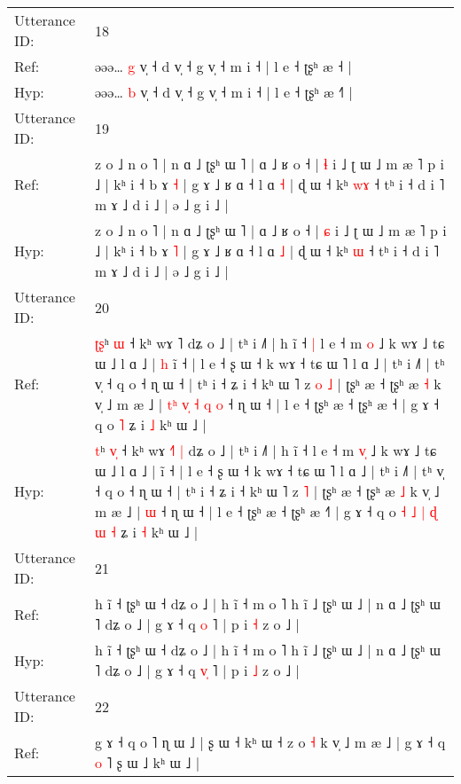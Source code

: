 \documentclass[10pt]{article}
\DeclareRobustCommand{\hl}[1]{{\textcolor{red}{#1}}}
\begin{document}
\begin{longtable}{ll}
\midrule
Utterance ID: & 18 \\
Ref: & əəə… \hl{g} v̩ ˧ d v̩ ˧ g v̩ ˧ m i ˧ | l e ˧ ʈʂʰ æ ˧\hl{} |
 \\
Hyp: & əəə… \hl{b} v̩ ˧ d v̩ ˧ g v̩ ˧ m i ˧ | l e ˧ ʈʂʰ æ ˧\hl{˥} |
 \\
\midrule
Utterance ID: & 19 \\
Ref: & z o ˩ n o ˥ | n ɑ ˩ ʈʂʰ ɯ ˥ | ɑ ˩ ʁ o ˧ | \hl{ɬ} i ˩ ʈ ɯ ˩ m æ ˥ p i ˩ | kʰ i ˧ b ɤ \hl{˧} | g ɤ ˩ ʁ ɑ ˧ l ɑ \hl{˧} | ɖ ɯ ˧ kʰ \hl{w}\hl{ɤ} ˧ tʰ i ˧ d i ˥ m ɤ ˩ d i ˩ | ə ˩ g i ˩ |
 \\
Hyp: & z o ˩ n o ˥ | n ɑ ˩ ʈʂʰ ɯ ˥ | ɑ ˩ ʁ o ˧ | \hl{ɕ} i ˩ ʈ ɯ ˩ m æ ˥ p i ˩ | kʰ i ˧ b ɤ \hl{˥} | g ɤ ˩ ʁ ɑ ˧ l ɑ \hl{˩} | ɖ ɯ ˧ kʰ \hl{}\hl{ɯ} ˧ tʰ i ˧ d i ˥ m ɤ ˩ d i ˩ | ə ˩ g i ˩ |
 \\
\midrule
Utterance ID: & 20 \\
Ref: & \hl{ʈ}\hl{ʂ}ʰ \hl{}\hl{ɯ} ˧ kʰ wɤ \hl{}˥\hl{}\hl{} dʑ o ˩ | tʰ i ˩˥ | h ĩ ˧\hl{ }\hl{|} l e ˧ m \hl{}\hl{o} ˩ k wɤ ˩ tɕ ɯ ˩ l ɑ ˩ |\hl{ }\hl{h} ĩ ˧ | l e ˧ ʂ ɯ ˧ k wɤ ˧ tɕ ɯ ˥ l ɑ ˩ | tʰ i ˩˥ | tʰ v̩ ˧ q o ˧ ɳ ɯ ˧ | tʰ i ˧ ʑ i ˧ kʰ ɯ ˥ z\hl{ }\hl{o} \hl{˩} | ʈʂʰ æ ˧ ʈʂʰ æ \hl{˧} k v̩ ˩ m æ ˩ |\hl{ }\hl{t}\hl{ʰ}\hl{ }\hl{v}\hl{̩}\hl{ }\hl{˧}\hl{ }\hl{q} \hl{o} ˧ ɳ ɯ ˧ | l e ˧ ʈʂʰ æ ˧ ʈʂʰ æ ˧\hl{} | g ɤ ˧ q o\hl{}\hl{}\hl{}\hl{}\hl{}\hl{}\hl{}\hl{}\hl{}\hl{} \hl{˥} ʑ i \hl{˩} kʰ ɯ ˩ |
 \\
Hyp: & \hl{}\hl{t}ʰ \hl{v}\hl{̩} ˧ kʰ wɤ \hl{˧}˥\hl{ }\hl{|} dʑ o ˩ | tʰ i ˩˥ | h ĩ ˧\hl{}\hl{} l e ˧ m \hl{v}\hl{̩} ˩ k wɤ ˩ tɕ ɯ ˩ l ɑ ˩ |\hl{}\hl{} ĩ ˧ | l e ˧ ʂ ɯ ˧ k wɤ ˧ tɕ ɯ ˥ l ɑ ˩ | tʰ i ˩˥ | tʰ v̩ ˧ q o ˧ ɳ ɯ ˧ | tʰ i ˧ ʑ i ˧ kʰ ɯ ˥ z\hl{}\hl{} \hl{˥} | ʈʂʰ æ ˧ ʈʂʰ æ \hl{˩} k v̩ ˩ m æ ˩ |\hl{}\hl{}\hl{}\hl{}\hl{}\hl{}\hl{}\hl{}\hl{}\hl{} \hl{ɯ} ˧ ɳ ɯ ˧ | l e ˧ ʈʂʰ æ ˧ ʈʂʰ æ ˧\hl{˥} | g ɤ ˧ q o\hl{ }\hl{˧}\hl{ }\hl{˩}\hl{ }\hl{|}\hl{ }\hl{ɖ}\hl{ }\hl{ɯ} \hl{˧} ʑ i \hl{˧} kʰ ɯ ˩ |
 \\
\midrule
Utterance ID: & 21 \\
Ref: & h ĩ ˧ ʈʂʰ ɯ ˧ dʑ o ˩ | h ĩ ˧ m o ˥ h ĩ ˩ ʈʂʰ ɯ ˩ | n ɑ ˩ ʈʂʰ ɯ ˥ dʑ o ˩ | g ɤ ˧ q \hl{}\hl{o} ˥ | p i \hl{˧} z o ˩ |
 \\
Hyp: & h ĩ ˧ ʈʂʰ ɯ ˧ dʑ o ˩ | h ĩ ˧ m o ˥ h ĩ ˩ ʈʂʰ ɯ ˩ | n ɑ ˩ ʈʂʰ ɯ ˥ dʑ o ˩ | g ɤ ˧ q \hl{v}\hl{̩} ˥ | p i \hl{˩} z o ˩ |
 \\
\midrule
Utterance ID: & 22 \\
Ref: & g ɤ ˧ q o ˥\hl{}\hl{}\hl{}\hl{}\hl{}\hl{}\hl{} ɳ ɯ ˩ | ʂ ɯ ˧ kʰ ɯ ˧ z o \hl{˧} k v̩ ˩ m æ ˩ | g ɤ ˧ q \hl{}\hl{o} ˥\hl{}\hl{} ʂ ɯ ˩ kʰ ɯ ˩ |

\end{longtable}
\end{document}

